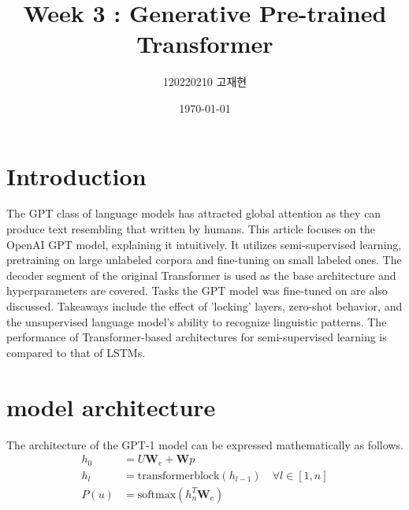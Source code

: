 \documentclass[
	11pt,
	a4paper,
	figtabcapt,
]{oblivoir}
\title{\vspace{-4cm}Week 3 : Generative Pre-trained Transformer}
\author{120220210 고재현}
\date{\today}
\begin{document}


\maketitle




\setcounter{table}{0}		                    %
\setcounter{figure}{0}		                    %



\section{Introduction}
The GPT class of language models has attracted global attention as they can produce text resembling that written by humans. This article focuses on the OpenAI GPT model, explaining it intuitively.
It utilizes semi-supervised learning, pretraining on large unlabeled corpora and fine-tuning on small labeled ones. The decoder segment of the original Transformer is used as the base architecture and hyperparameters are covered.
Tasks the GPT model was fine-tuned on are also discussed. Takeaways include the effect of 'locking' layers, zero-shot behavior, and the unsupervised language model's ability to recognize linguistic patterns.
The performance of Transformer-based\cite{NIPS2017_3f5ee243} architectures for semi-supervised learning is compared to that of LSTMs.

\section{model architecture}\label{sec:architecture}
The architecture of the GPT-1  model can be expressed mathematically as follows.
\begin{align}
	h_0 &= U \textbf{W}_e + \textbf{W}p \\
	h_l &= \text{transformerblock}(h_{l-1}) \quad \forall l \in [1, n] \\
	P(u) &= \text{softmax}(h_n^T \textbf{W}_e)
\end{align}
	
\end{document}
